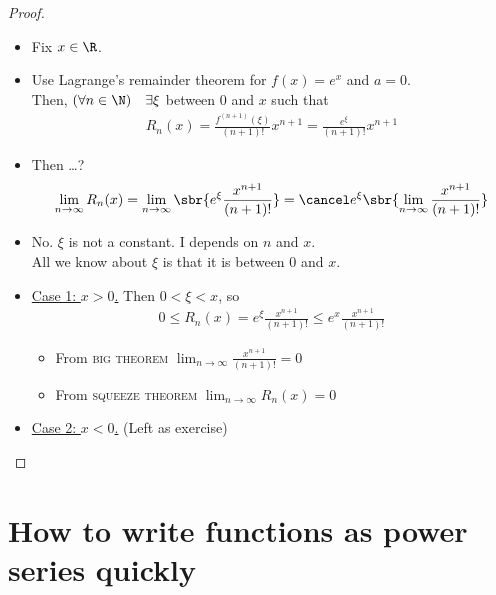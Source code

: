 \begin{proof}~
    \begin{itemize}
        \item Fix \(x \in \R\).
        \item Use Lagrange's remainder theorem for \(f(x) = e^x\) and \(a = 0\). \\
              Then, \((\forall n \in \N) \quad \exists \xi \) between \(0\) and \(x\) such that \begin{align*}
                  R_n(x) = \frac{f^{(n+1)}(\xi)}{(n+1)!}x^{n+1} = \frac{e^\xi}{(n+1)!}x^{n+1}
              \end{align*}
        \item Then \dots?\begin{align*}
                  \lim_{n\to\infty} R_n(x) = \lim_{n\to\infty} \sbr{e^\xi\frac{x^{n+1}}{(n+1)!}} = \Ccancel[red]{
                      e^\xi \sbr{\lim_{n\to\infty} \frac{x^{n+1}}{(n+1)!}}
                  }
              \end{align*}
        \item No. {\color{red} \(\xi\) is not a constant.} I depends on \(n\) and \(x\). \\
              All we know about \(\xi\) is that it is between \(0\) and \(x\).
        \item \underline{Case 1: \(x > 0\).} Then \(0 < \xi < x\), so \begin{align*}
                  0 \leq R_n(x) = e^\xi \frac{x^{n+1}}{(n+1)!} \leq e^x \frac{x^{n+1}}{(n+1)!}
              \end{align*} \begin{itemize}
                  \item From \textsc{big theorem} \(\lim_{n\to\infty} \frac{x^{n+1}}{(n+1)!} = 0\)
                  \item From \textsc{squeeze theorem} \(\lim_{n\to\infty} R_n(x) = 0\)
              \end{itemize}
        \item \underline{Case 2: \(x < 0\).} (Left as exercise)
    \end{itemize}
\end{proof}


\newpage
\section{How to write functions as power series quickly}
